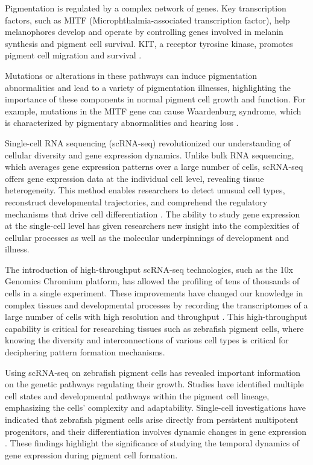 \documentclass[runningheads]{llncs}
\begin{document}
Pigmentation is regulated by a complex network of genes. Key transcription factors, such as MITF (Microphthalmia-associated transcription factor), help melanophores develop and operate by controlling genes involved in melanin synthesis and pigment cell survival. KIT, a receptor tyrosine kinase, promotes pigment cell migration and survival \cite{kenny2022tfap2,jang2021epigenetic}. 

Mutations or alterations in these pathways can induce pigmentation abnormalities and lead to a variety of pigmentation illnesses, highlighting the importance of these components in normal pigment cell growth and function. For example, mutations in the MITF gene can cause Waardenburg syndrome, which is characterized by pigmentary abnormalities and hearing loss \cite{kenny2022tfap2,huang2022genetic}.

Single-cell RNA sequencing (scRNA-seq) revolutionized our understanding of cellular diversity and gene expression dynamics. Unlike bulk RNA sequencing, which averages gene expression patterns over a large number of cells, scRNA-seq offers gene expression data at the individual cell level, revealing tissue heterogeneity. This method enables researchers to detect unusual cell types, reconstruct developmental trajectories, and comprehend the regulatory mechanisms that drive cell differentiation \cite{nayak2021hitchhiker}. The ability to study gene expression at the single-cell level has given researchers new insight into the complexities of cellular processes as well as the molecular underpinnings of development and illness.

The introduction of high-throughput scRNA-seq technologies, such as the 10x Genomics Chromium platform, has allowed the profiling of tens of thousands of cells in a single experiment. These improvements have changed our knowledge in complex tissues and developmental processes by recording the transcriptomes of a large number of cells with high resolution and throughput \cite{stuart2019comprehensive,lencer2021single}. This high-throughput capability is critical for researching tissues such as zebrafish pigment cells, where knowing the diversity and interconnections of various cell types is critical for deciphering pattern formation mechanisms\cite{jang2021epigenetic,budi2008embryonic,camargo2019endothelin}.

Using scRNA-seq on zebrafish pigment cells has revealed important information on the genetic pathways regulating their growth. Studies have identified multiple cell states and developmental pathways within the pigment cell lineage, emphasizing the cells' complexity and adaptability. Single-cell investigations have indicated that zebrafish pigment cells arise directly from persistent multipotent progenitors, and their differentiation involves dynamic changes in gene expression \cite{subkhankulova2023zebrafish}. These findings highlight the significance of studying the temporal dynamics of gene expression during pigment cell formation.
\end{document}
